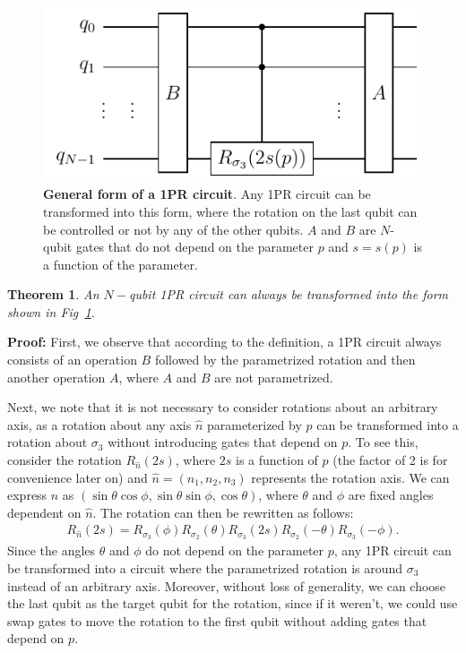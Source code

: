 \documentclass[10pt,letterpaper]{article} %
\newcommand{\fref}[1]{Fig~\ref{#1}}
\newtheorem{theorem}{Theorem}
\begin{document}
\begin{figure} %
\centering
\includegraphics{images/OPR-circuit.pdf}
\caption{\textbf{General form of a 1PR circuit}.
Any 1PR circuit can be transformed into this form,
where the rotation on the last qubit
can be controlled or not by any of the other qubits.
$A$ and $B$
are $N$-qubit gates that do not depend on the parameter $p$ and
$s= s(p)$ is a function of the parameter.}
\label{Fig4}
\end{figure} %

\begin{theorem}
An $N-$qubit 1PR circuit can always be transformed 
into the form shown in \fref{Fig4}.
\end{theorem}
\textbf{Proof:} 
First, we observe that according to the
definition, a 1PR circuit always consists of an operation $B$ followed 
by the parametrized rotation and then another operation $A$, 
where $A$ and $B$ are not parametrized.

Next, we note that it is not necessary to consider rotations about an arbitrary axis,
as a rotation about any axis $\hat{n}$ parameterized by $p$
can be transformed into a rotation about $\sigma_3$ without introducing 
gates that depend on $p$. To see this, consider the rotation $R_{\hat{n}}(2s)$, where $2s$ 
is a function of $p$ (the factor of 2 is for convenience later on) 
and $\hat{n} = (n_1,n_2,n_3)$ represents the rotation axis. 
We can express $\hat{n}$ as $(\sin \theta \cos \phi, \sin \theta \sin \phi, \cos \theta)$, 
where $\theta$ and $\phi$ are fixed angles dependent on $\hat{n}$. 
The rotation can then be rewritten as follows:
\begin{eqnarray}
R_{\hat{n}}(2s) = R_{\sigma_3}(\phi) R_{\sigma_2}(\theta) R_{\sigma_3}(2s) R_{\sigma_2}(-\theta) R_{\sigma_3}(-\phi).
\end{eqnarray}
Since the angles $\theta$ and $\phi$ do not depend on the parameter $p$,
any 1PR circuit can be transformed into a circuit where the parametrized
 rotation is around $\sigma_3$ instead of an arbitrary axis. 
Moreover, without loss of generality, we can choose the last qubit as the
target qubit for the rotation, since if it weren't, we could use
swap gates to move the rotation
to the first qubit without adding gates
that depend on $p$. 
\end{document}
